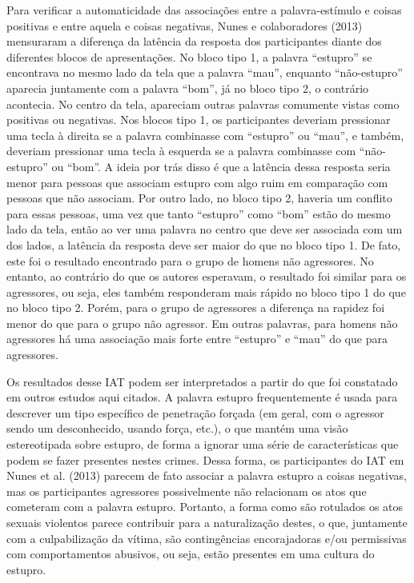 Para verificar a automaticidade das associações entre a palavra-estímulo e coisas positivas e entre aquela e coisas negativas, Nunes e colaboradores (2013) mensuraram a diferença da latência da resposta dos participantes diante dos diferentes blocos de apresentações. No bloco tipo 1, a palavra ``estupro'' se encontrava no mesmo lado da tela que a palavra ``mau'', enquanto ``não-estupro'' aparecia juntamente com a palavra ``bom'', já no bloco tipo 2, o contrário acontecia. No centro da tela, apareciam outras palavras comumente vistas como positivas ou negativas. Nos blocos tipo 1, os participantes deveriam pressionar uma tecla à direita se a palavra combinasse com ``estupro'' ou ``mau'', e também, deveriam pressionar uma tecla à esquerda se a palavra combinasse com ``não-estupro'' ou ``bom''. A ideia por trás disso é que a latência dessa resposta seria menor para pessoas que associam estupro com algo ruim em comparação com pessoas que não associam. Por outro lado, no bloco tipo 2, haveria um conflito para essas pessoas, uma vez que tanto ``estupro'' como ``bom'' estão do mesmo lado da tela, então ao ver uma palavra no centro que deve ser associada com um dos lados, a latência da resposta deve ser maior do que no bloco tipo 1. De fato, este foi o resultado encontrado para o grupo de homens não agressores. No entanto, ao contrário do que os autores esperavam, o resultado foi similar para os agressores, ou seja, eles também responderam mais rápido no bloco tipo 1 do que no bloco tipo 2. Porém, para o grupo de agressores a diferença na rapidez foi menor do que para o grupo não agressor. Em outras palavras, para homens não agressores há uma associação mais forte entre ``estupro'' e ``mau'' do que para agressores.

Os resultados desse IAT podem ser interpretados a partir do que foi constatado em outros estudos aqui citados. A palavra estupro frequentemente é usada para descrever um tipo específico de penetração forçada (em geral, com o agressor sendo um desconhecido, usando força, etc.), o que mantém uma visão estereotipada sobre estupro, de forma a ignorar uma série de características que podem se fazer presentes nestes crimes. Dessa forma, os participantes do IAT em Nunes et al. (2013) parecem de fato associar a palavra estupro a coisas negativas, mas os participantes agressores possivelmente não relacionam os atos que cometeram com a palavra estupro. Portanto, a forma como são rotulados os atos sexuais violentos parece contribuir para a naturalização destes, o que, juntamente com a culpabilização da vítima, são contingências encorajadoras e/ou permissivas com comportamentos abusivos, ou seja, estão presentes em uma cultura do estupro.

